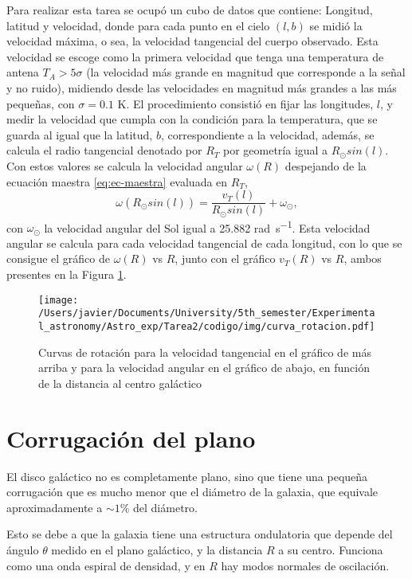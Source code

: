 \documentclass[letterpaper,oneside]{article}
\begin{document}
Para realizar esta tarea se ocupó un cubo de datos que contiene: Longitud, latitud y velocidad, donde para cada punto en el cielo $(l,b)$ se midió la velocidad máxima, o sea, la velocidad tangencial del cuerpo observado. Esta velocidad se escoge como la primera velocidad que tenga una temperatura de antena $T_A>5\sigma$ (la velocidad más grande en magnitud que corresponde a la señal y no ruido), midiendo desde las velocidades en magnitud más grandes a las más pequeñas, con $\sigma =0.1$ \si{\kelvin}. El procedimiento consistió en fijar las longitudes, $l$, y medir la velocidad que cumpla con la condición para la temperatura, que se guarda al igual que la latitud, $b$, correspondiente a la velocidad, además, se calcula el radio tangencial denotado por $R_T$ por geometría igual a $R_{\odot}sin(l)$. Con estos valores se calcula la velocidad angular $\omega(R)$ despejando de la ecuación maestra \ref{eq:ec-maestra} evaluada en $R_T$,
\begin{equation*}
\omega(R_{\odot}sin(l))=\frac{v_T(l)}{R_{\odot}sin(l)}+\omega_{\odot},
\end{equation*}
con $\omega_{\odot}$ la velocidad angular del Sol igual a 25.882 \si{\radian\per\second}. Esta velocidad angular se calcula para cada velocidad tangencial de cada longitud, con lo que se consigue el gráfico de $\omega(R)$ vs $R$, junto con el gráfico $v_T(R)$ vs $R$, ambos presentes en la Figura \ref{fig:curva-rotacion}.
\begin{figure}[H]
    \centering
    \texttt{[image: /Users/javier/Documents/University/5th\_semester/Experimental\_astronomy/Astro\_exp/Tarea2/codigo/img/curva\_rotacion.pdf]}
    \caption{Curvas de rotación para la velocidad tangencial en el gráfico de más arriba y para la velocidad angular en el gráfico de abajo, en función de la distancia al centro galáctico}
    \label{fig:curva-rotacion}
\end{figure}
\newpage
\section{Corrugación del plano}
El disco galáctico no es completamente plano, sino que tiene una pequeña corrugación que es mucho menor que el diámetro de la galaxia, que equivale aproximadamente a  $\sim 1\%$ del diámetro.

Esto se debe a que la galaxia tiene una estructura ondulatoria que depende del ángulo $\theta$ medido en el plano galáctico, y la distancia $R$ a su centro. Funciona como una onda espiral de densidad, y en $R$ hay modos normales de oscilación. %
\end{document}
